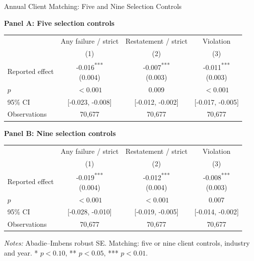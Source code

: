 \documentclass[10pt]{article}
\newcommand{\sym}[1]{\textsuperscript{#1}}
\begin{document}
\fontsize{10}{12}\selectfont
\setlength{\tabcolsep}{3pt}\renewcommand{\arraystretch}{1.15}
\begin{center}\large Annual Client Matching: Five and Nine Selection Controls\end{center}
\medskip\textbf{Panel A: Five selection controls}\par\smallskip
\begin{tabular*}{\textwidth}{@{\extracolsep{\fill}}lccc@{}}
\toprule
 & Any failure / strict & Restatement / strict & Violation \\
 & (1) & (2) & (3) \\
\midrule
Reported effect & \shortstack{-0.016\sym{***}\\(0.004)} & \shortstack{-0.007\sym{***}\\(0.003)} & \shortstack{-0.011\sym{***}\\(0.003)} \\
$p$ & $<0.001$ & 0.009 & $<0.001$ \\
95\% CI & [-0.023, -0.008] & [-0.012, -0.002] & [-0.017, -0.005] \\
Observations & 70,677 & 70,677 & 70,677 \\
\bottomrule\end{tabular*}\par
\medskip\textbf{Panel B: Nine selection controls}\par\smallskip
\begin{tabular*}{\textwidth}{@{\extracolsep{\fill}}lccc@{}}
\toprule
 & Any failure / strict & Restatement / strict & Violation \\
 & (1) & (2) & (3) \\
\midrule
Reported effect & \shortstack{-0.019\sym{***}\\(0.004)} & \shortstack{-0.012\sym{***}\\(0.004)} & \shortstack{-0.008\sym{***}\\(0.003)} \\
$p$ & $<0.001$ & $<0.001$ & 0.007 \\
95\% CI & [-0.028, -0.010] & [-0.019, -0.005] & [-0.014, -0.002] \\
Observations & 70,677 & 70,677 & 70,677 \\
\bottomrule\end{tabular*}\par
\medskip\fontsize{9}{11}\selectfont\textit{Notes:} Abadie--Imbens robust SE. Matching: five or nine client controls, industry and year. * $p<0.10$, ** $p<0.05$, *** $p<0.01$.
\end{document}

